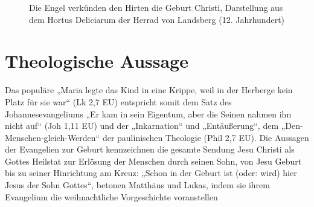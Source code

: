 \begin{figure}
  \centering
  \caption[Abbildung 1. Die Engel verkünden den Hirten die Geburt Christi ]{Die Engel verkünden den Hirten die Geburt Christi, Darstellung aus dem Hortus Deliciarum der Herrad von Landsberg (12. Jahrhundert)}
  \label{Christi}
\end{figure}

\section{Theologische Aussage}

Das populäre „Maria legte das Kind in eine Krippe, weil in der Herberge kein Platz für sie war“ (Lk 2,7 EU) entspricht somit dem Satz des Johannesevangeliums „Er kam in sein Eigentum, aber die Seinen nahmen ihn nicht auf“ (Joh 1,11 EU) und der „Inkarnation“ und „Entäußerung“, dem „Den-Menschen-gleich-Werden“ der paulinischen Theologie (Phil 2,7 EU). Die Aussagen der Evangelien zur Geburt kennzeichnen die gesamte Sendung Jesu Christi als Gottes Heilstat zur Erlösung der Menschen durch seinen Sohn, von Jesu Geburt bis zu seiner Hinrichtung am Kreuz: „Schon in der Geburt ist (oder: wird) hier Jesus der Sohn Gottes“, betonen Matthäus und Lukas, indem sie ihrem Evangelium die weihnachtliche Vorgeschichte voranstellen



